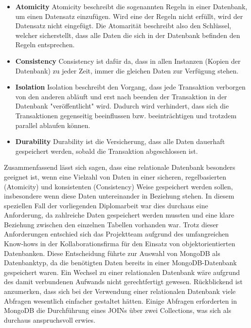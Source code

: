 \begin{itemize}
    \item \textbf{Atomicity}
        \newline
        Atomicity beschreibt die sogenannten Regeln in einer Datenbank, um einen Datensatz einzufügen. Wird eine der Regeln nicht erfüllt, wird der Datensatz nicht eingefügt. Die Atomarität beschreibt also den Schlüssel, welcher sicherstellt, dass alle Daten die sich in der Datenbank befinden den Regeln entsprechen.
    \item \textbf{Consistency}
        \newline
       Consistency ist dafür da, dass in allen Instanzen (Kopien der Datenbank) zu jeder Zeit, immer die gleichen Daten zur Verfügung stehen.
    \item \textbf{Isolation}
        \newline
        Isolation beschreibt den Vorgang, dass jede Transaktion verborgen von den anderen abläuft und erst nach beenden der Transaktion in der Datenbank "veröffentlicht" wird. Dadurch wird verhindert, dass sich die Transaktionen gegenseitig beeinflussen bzw. beeinträchtigen und trotzdem parallel ablaufen können.
    \item \textbf{Durability}
        \newline
        Durability ist die Versicherung, dass alle Daten dauerhaft gespeichert werden, sobald die Transaktion abgeschlossen ist.
\end{itemize}
Zusammenfassend lässt sich sagen, dass eine relationale Datenbank besonders geeignet ist, wenn eine Vielzahl von Daten in einer sicheren, regelbasierten (Atomicity) und konsistenten (Consistency) Weise gespeichert werden sollen, insbesondere wenn diese Daten untereinander in Beziehung stehen. In diesem speziellen Fall der vorliegenden Diplomarbeit war dies durchaus eine Anforderung, da zahlreiche Daten gespeichert werden mussten und eine klare Beziehung zwischen den einzelnen Tabellen vorhanden war.
\newline
Trotz dieser Anforderungen entschied sich das Projektteam aufgrund des umfangreichen Know-hows in der Kollaborationsfirma für den Einsatz von objektorientierten Datenbanken. Diese Entscheidung führte zur Auswahl von MongoDB als Datenbanktyp, da die benötigten Daten bereits in einer MongoDB-Datenbank gespeichert waren. Ein Wechsel zu einer relationalen Datenbank wäre aufgrund des damit verbundenen Aufwands nicht gerechtfertigt gewesen.
\newline
Rückblickend ist anzumerken, dass sich bei der Verwendung einer relationalen Datenbank viele Abfragen wesentlich einfacher gestaltet hätten. Einige Abfragen erforderten in MongoDB die Durchführung eines JOINs über zwei Collections, was sich als durchaus anspruchsvoll erwies.

